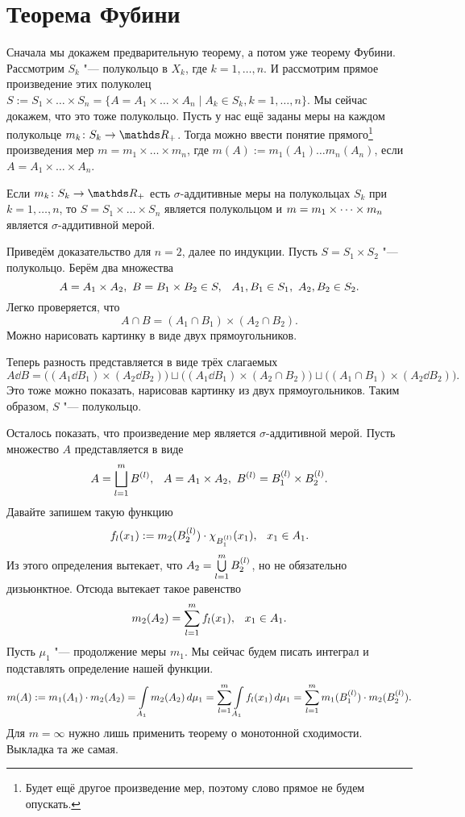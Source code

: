 \section{Теорема Фубини}
  Сначала мы докажем предварительную теорему, а потом уже теорему Фубини. Рассмотрим $S_k$ "--- полукольцо в $X_k$, где $k=1,\dots, n$. И рассмотрим прямое произведение этих полуколец $S:= S_1\times\dots\times S_n = \{ A = A_1\times\dots\times A_n\mid A_k\in S_k,k=1,\dots,n\}$. Мы сейчас докажем, что это тоже полукольцо. Пусть у нас ещё заданы меры на каждом полукольце $m_k\colon S_k\to\R_+$. Тогда можно ввести понятие прямого\footnote{Будет ещё другое произведение мер, поэтому слово прямое не будем опускать.} произведения мер $m = m_1\times \dots\times m_n$, где $m(A):= m_1(A_1)\dots m_n(A_n)$, если $A = A_1\times\dots\times A_n$.

\begin{The}
  Если $m_k\colon S_k\to\R_+$ есть $\sigma$-аддитивные меры на полукольцах $S_k$ при $k=1,\dots,n$, то $S=S_1\times \dots\times S_n$ является полукольцом и $m=m_1\times\dots\times m_n$ является $\sigma$-аддитивной мерой.
\end{The}
\begin{Proof}
 Приведём доказательство для $n=2$, далее по индукции. Пусть $S=S_1\times S_2$ "--- полукольцо. Берём два множества
\[
  A = A_1\times A_2,\ B=B_1\times B_2\in S,\pau A_1,B_1\in S_1,\ A_2,B_2\in S_2.
\]
Легко проверяется, что
\[
  A\cap B = (A_1\cap B_1)\times (A_2\cap B_2).
\]
Можно нарисовать картинку в виде двух прямоугольников.

Теперь разность представляется в виде трёх слагаемых
\[
  A\dd B = \big((A_1\dd B_1)\times (A_2\dd B_2)\big)\sqcup
	   \big((A_1\dd B_1)\times (A_2\cap B_2)\big)\sqcup
	   \big((A_1\cap B_1)\times (A_2\dd B_2)\big).
\]
Это тоже можно показать, нарисовав картинку из двух прямоугольников. Таким образом, $S$ "--- полукольцо.

Осталось показать, что произведение мер является $\sigma$-аддитивной мерой. Пусть множество $A$ представляется в виде
\[
  A = \bigsqcup\limits_{l=1}^{m} B^{(l)},\hskip .75em plus.1em minus.08em\relax A = A_1\times A_2,\ B^{(l)} = B_1^{(l)}\times B_2^{(l)}.
\]
Давайте запишем такую функцию
\[
  f_l(x_1):=m_2(B_2^{(l)})\cdot\chi_{B_1^{(l)}}(x_1),\hskip .75em plus.1em minus.08em\relax x_1\in A_1.
\]
Из этого определения вытекает, что $A_2 = \bigcup\limits_{l=1}^{m} B_2^{(l)}$, но не обязательно дизьюнктное. Отсюда вытекает такое равенство
\[
  m_2(A_2) = \RY l1m f_l(x_1),\pau x_1\in A_1.
\]
Пусть $\mu_1$ "--- продолжение меры $m_1$. Мы сейчас будем писать интеграл и подставлять определение нашей функции.
\[
  m(A):=m_1(A_1)\cdot m_2(A_2) = \int\limits_{A_1} m_2(A_2)\,d\mu_1 = \sum\limits_{l = 1}^{m} \int\limits_{A_1}f_l(x_1)\,d\mu_1 = \sum\limits_{l = 1}^{m} m_1( B_1^{(l)})\cdot m_2(B_2^{(l)}).
\]
Для $m=\infty$ нужно лишь применить теорему о монотонной сходимости. Выкладка та же самая.
\end{Proof}

